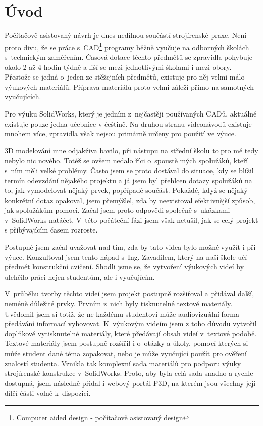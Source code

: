 \chapter*{Úvod}
Počítačově asistovaný návrh je dnes nedílnou součástí strojírenské praxe.
Není proto divu, že se práce s~CAD\footnote{Computer aided design - počítačově asistovaný design} programy běžně vyučuje na odborných školách s~technickým zaměřením.
Časová dotace těchto předmětů se zpravidla pohybuje okolo 2 až 4 hodin týdně a liší se mezi jednotlivými školami i mezi obory.
Přestože se jedná o~jeden ze stěžejních předmětů, existuje pro něj velmi málo výukových materiálů.
Příprava materiálů proto velmi záleží přímo na samotných vyučujících.

Pro výuku SolidWorks, který je jedním z~nejčastěji používaných CADů, aktuálně existuje pouze jedna učebnice v češtině.
Na druhou stranu videonávodů existuje mnohem více, zpravidla však nejsou primárně určeny pro použití ve výuce.

3D modelování mne odjakživa bavilo, při nástupu na střední školu to pro mě tedy nebylo nic nového.
Totéž se ovšem nedalo říci o~spoustě mých spolužáků, kteří s~ním měli velké problémy.
Často jsem se proto dostával do situace, kdy se blížil termín odevzdání nějakého projektu a já jsem byl přehlcen dotazy spolužáků na to, jak vymodelovat nějaký prvek, popřípadě součást.
Pokaždé, když se nějaký konkrétní dotaz opakoval, jsem přemýšlel, zda by neexistoval efektivnější způsob, jak spolužákům pomoci.
Začal jsem proto odpovědi společně s~ukázkami v~SolidWorks natáčet.
V~této počáteční fázi jsem však netušil, jak se celý projekt s přibývajícím časem rozroste.

Postupně jsem začal uvažovat nad tím, zda by tato videa bylo možné využít i při výuce.
Konzultoval jsem tento nápad s~Ing. Zavadilem, který na naší škole učí předmět konstrukční cvičení.
Shodli jsme se, že vytvoření výukových videí by ulehčilo práci nejen studentům, ale i vyučujícím.

V~průběhu tvorby těchto videí jsem projekt postupně rozšiřoval a přidával další, neméně důležité prvky.
Prvním z~nich byly tisknutelné textové materiály.
Uvědomil jsem si totiž, že ne každému studentovi může audiovizuální forma předávání informací vyhovovat.
K~výukovým videím jsem z toho důvodu vytvořil doplňkové vytisknutelné materiály, které předávají obsah videí v~textové podobě.
Textové materiály jsem postupně rozšířil i o~otázky a úkoly, pomocí kterých si může student dané téma zopakovat, nebo je může vyučující použít pro ověření znalostí studenta.
Vznikla tak komplexní sada materiálů pro podporu výuky strojírenské konstrukce v~SolidWorks.
Proto, aby byla celá sada snadno a rychle dostupná, jsem následně přidal i webový portál P3D, na kterém jsou všechny její dílčí části volně k~dispozici.


